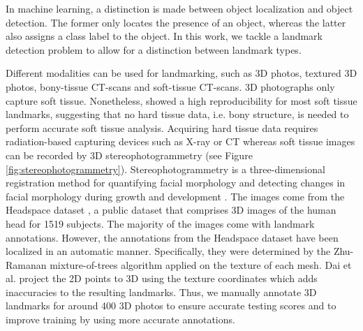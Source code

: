 In machine learning, a distinction is made between object localization and object detection. The former only locates the presence of an object, whereas the latter also assigns a class label to the object. In this work, we tackle a landmark detection problem to allow for a distinction between landmark types.

Different modalities can be used for landmarking, such as 3D photos, textured 3D photos, bony-tissue CT-scans and soft-tissue CT-scans. 3D photographs only capture soft tissue. Nonetheless, \cite{Plooij2009} showed a high reproducibility for most soft tissue landmarks, suggesting that no hard tissue data, i.e. bony structure, is needed to perform accurate soft tissue analysis. Acquiring hard tissue data requires radiation-based capturing devices such as X-ray or CT whereas soft tissue images can be recorded by 3D stereophotogrammetry (see Figure \ref{fig:stereophotogrammetry}). Stereophotogrammetry is a three-dimensional registration method for quantifying facial morphology and detecting changes in facial morphology during growth and development \cite{Ras1996}.
The images come from the Headspace dataset \cite{Dai2019}, a public dataset that comprises 3D images of the human head for 1519 subjects. The majority of the images come with landmark annotations. However, the annotations from the Headspace dataset have been localized in an automatic manner. Specifically, they were determined by the Zhu-Ramanan mixture-of-trees algorithm \cite{Zhu2012} applied on the texture of each mesh. Dai et al. project the 2D points to 3D using the texture coordinates which adds inaccuracies to the resulting landmarks. Thus, we manually annotate 3D landmarks for around 400 3D photos to ensure accurate testing scores and to improve training by using more accurate annotations.

